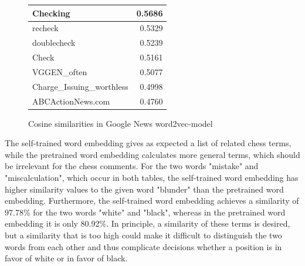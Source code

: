 \documentclass[article,type=msc,colorback,accentcolor=tud7b]{tudthesis}
\begin{document}
\begin{figure}[H]
\begin{floatrow}
{{\begin{tabular}{| l | r |}
		Checking & 0.5686 \\ \hline
		recheck & 0.5329 \\ \hline
		doublecheck & 0.5239 \\ \hline
		Check & 0.5161 \\ \hline
		VGGEN\_often & 0.5077 \\ \hline
		Charge\_Issuing\_worthless & 0.4998 \\ \hline
		ABCActionNews.com & 0.4760 \\ \hline
      \end{tabular}
      }
      \quad
      }{%
        \caption{Cosine similarities in Google News word2vec-model}
        \label{tab:cosine_similarities_w2v_pretrained}
      }
      \end{floatrow}
	\end{figure}

    The self-trained word embedding gives as expected a list of related chess terms, while the pretrained word embedding calculates more general terms, which should be irrelevant for the chess comments. For the two words "mistake" and "miscalculation", which occur in both tables, the self-trained word embedding has higher similarity values to the given word "blunder" than the pretrained word embedding. Furthermore, the self-trained word embedding achieves a similarity of 97.78\% for the two words "white" and "black", whereas in the pretrained word embedding it is only 80.92\%. In principle, a similarity of these terms is desired, but a similarity that is too high could make it difficult to distinguish the two words from each other and thus complicate decisions whether a position is in favor of white or in favor of black.
    
\end{document}
